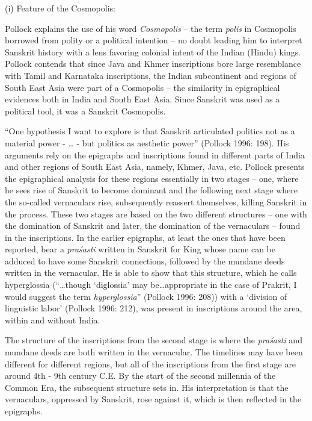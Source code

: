 (i) Feature of the Cosmopolis:

Pollock explains the use of his word \textit{Cosmopolis} – the term \textit{polis} in Cosmopolis borrowed from polity or a political intention – no doubt leading him to interpret Sanskrit history with a lens favoring colonial intent of the Indian (Hindu) kings. Pollock contends that since Java and Khmer inscriptions bore large resemblance with Tamil and Karnataka inscriptions, the Indian subcontinent and regions of South East Asia were part of a Cosmopolis – the similarity in epigraphical evidences both in India and South East Asia. Since Sanskrit was used as a political tool, it was a Sanskrit Cosmopolis.

“One hypothesis I want to explore is that Sanskrit articulated politics not as a material power - … - but politics as aesthetic power” (Pollock 1996: 198). His arguments rely on the epigraphs and inscriptions found in different parts of India and other regions of South East Asia, namely, Khmer, Java, etc. Pollock presents the epigraphical analysis for these regions essentially in two stages – one, where he sees rise of Sanskrit to become dominant and the following next stage where the so-called vernaculars rise, subsequently reassert themselves, killing Sanskrit in the process. These two stages are based on the two different structures – one with the domination of Sanskrit and later, the domination of the vernaculars – found in the inscriptions. In the earlier epigraphs, at least the ones that have been reported, bear a \textit{praśasti} written in Sanskrit for King whose name can be adduced to have some Sanskrit connections, followed by the mundane deeds written in the vernacular. He is able to show that this structure, which he calls hyperglossia (“…though ‘diglossia’ may be…appropriate in the case of Prakrit, I would suggest the term \textit{hyperglossia}” (Pollock 1996: 208)) with a ‘division of linguistic labor’ (Pollock 1996: 212), was present in inscriptions around the area, within and without India.

The structure of the inscriptions from the second stage is where the \textit{praśasti} and mundane deeds are both written in the vernacular. The timelines may have been different for different regions, but all of the inscriptions from the first stage are around 4th - 9th century C.E. By the start of the second millennia of the Common Era, the subsequent structure sets in. His interpretation is that the vernaculars, oppressed by Sanskrit, rose against it, which is then reflected in the epigraphs.

